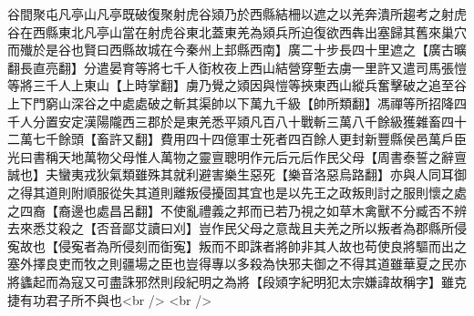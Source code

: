 谷間聚屯凡亭山凡亭既破復聚射虎谷熲乃於西縣結柵以遮之以羌奔潰所趨考之射虎谷在西縣東北凡亭山當在射虎谷東北蓋東羌為熲兵所迫復欲西犇出塞歸其舊來巢穴而殱於是谷也賢曰西縣故城在今秦州上邽縣西南】廣二十步長四十里遮之【廣古曠翻長直亮翻】分遣晏育等將七千人衘枚夜上西山結營穿塹去虜一里許又遣司馬張愷等將三千人上東山【上時掌翻】虜乃覺之熲因與愷等挾東西山縱兵奮擊破之追至谷上下門窮山深谷之中處處破之斬其渠帥以下萬九千級【帥所類翻】馮禪等所招降四千人分置安定漢陽隴西三郡於是東羌悉平熲凡百八十戰斬三萬八千餘級獲雜畜四十二萬七千餘頭【畜許又翻】費用四十四億軍士死者四百餘人更封新豐縣侯邑萬戶臣光曰書稱天地萬物父母惟人萬物之靈亶聰明作元后元后作民父母【周書泰誓之辭亶誠也】夫蠻夷戎狄氣類雖殊其就利避害樂生惡死【樂音洛惡烏路翻】亦與人同耳御之得其道則附順服從失其道則離叛侵擾固其宜也是以先王之政叛則討之服則懷之處之四裔【裔邊也處昌呂翻】不使亂禮義之邦而已若乃視之如草木禽獸不分臧否不辨去來悉艾殺之【否音鄙艾讀曰刈】豈作民父母之意哉且夫羌之所以叛者為郡縣所侵寃故也【侵寃者為所侵刻而衘寃】叛而不即誅者將帥非其人故也苟使良將驅而出之塞外擇良吏而牧之則疆場之臣也豈得專以多殺為快邪夫御之不得其道雖華夏之民亦將蠭起而為寇又可盡誅邪然則段紀明之為將【段熲字紀明犯太宗嫌諱故稱字】雖克捷有功君子所不與也<br />
<br />
